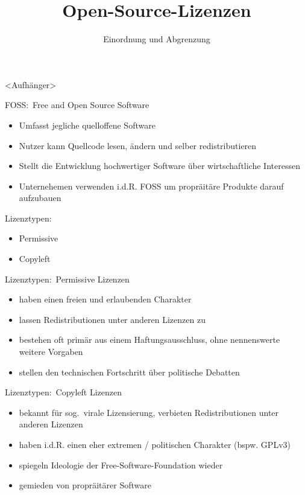 \documentclass{beamer}
\title{Open-Source-Lizenzen}
\subtitle{Einordnung und Abgrenzung}
\begin{document}
\maketitle

\begin{frame}
	\Large{<Aufhänger>}
\end{frame}

\begin{frame}
	\Large{FOSS:\ Free and Open Source Software}

	\begin{itemize}
		\item Umfasst jegliche quelloffene Software
		\item Nutzer kann Quellcode lesen, ändern und selber redistributieren
		\item Stellt die Entwicklung hochwertiger Software über wirtschaftliche
			Interessen
		\item Unternehemen verwenden i.d.R. FOSS um propräitäre Produkte darauf
			aufzubauen
	\end{itemize}
\end{frame}

\begin{frame}
	\Large{Lizenztypen:}

	\begin{itemize}
		\item Permissive
		\item Copyleft
	\end{itemize}
\end{frame}

\begin{frame}
	\Large{Lizenztypen:\ Permissive Lizenzen}

	\begin{itemize}
		\item haben einen freien und erlaubenden Charakter
		\item lassen Redistributionen unter anderen Lizenzen zu
		\item bestehen oft primär aus einem Haftungsausschluss, ohne
			nennenswerte weitere Vorgaben
		\item stellen den technischen Fortschritt über politische Debatten
	\end{itemize}
\end{frame}

\begin{frame}
	\Large{Lizenztypen:\ Copyleft Lizenzen}

	\begin{itemize}
		\item bekannt für sog.\ virale Lizensierung,
			verbieten Redistributionen unter anderen Lizenzen
		\item haben i.d.R. einen eher extremen / politischen Charakter (bspw. GPLv3)
		\item spiegeln Ideologie der Free-Software-Foundation wieder
		\item gemieden von propräitärer Software
	\end{itemize}
\end{frame}
\end{document}
